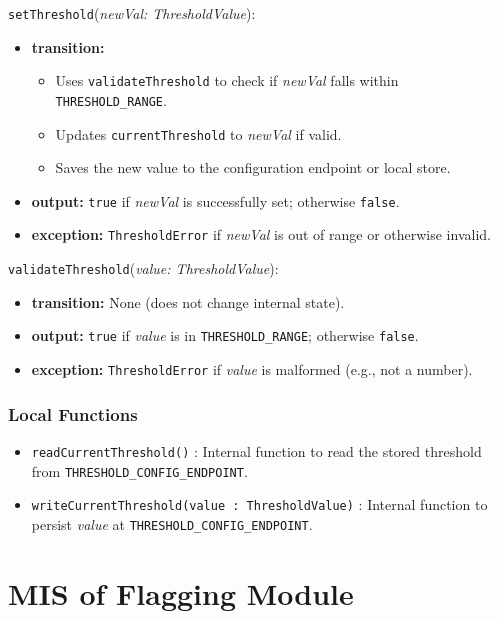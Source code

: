 \documentclass[12pt, titlepage]{article}
\begin{document}
\noindent \texttt{setThreshold}(\textit{newVal: ThresholdValue}):
\begin{itemize}
    \item \textbf{transition:}
    \begin{itemize}
        \item Uses \texttt{validateThreshold} to check if \textit{newVal} falls within \texttt{THRESHOLD\_RANGE}.
        \item Updates \texttt{currentThreshold} to \textit{newVal} if valid.
        \item Saves the new value to the configuration endpoint or local store.
    \end{itemize}
    \item \textbf{output:} \texttt{true} if \textit{newVal} is successfully set; otherwise \texttt{false}.
    \item \textbf{exception:} \texttt{ThresholdError} if \textit{newVal} is out of range or otherwise invalid.
\end{itemize}

\noindent \texttt{validateThreshold}(\textit{value: ThresholdValue}):
\begin{itemize}
    \item \textbf{transition:} None (does not change internal state).
    \item \textbf{output:} \texttt{true} if \textit{value} is in \texttt{THRESHOLD\_RANGE}; otherwise \texttt{false}.
    \item \textbf{exception:} \texttt{ThresholdError} if \textit{value} is malformed (e.g., not a number).
\end{itemize}

\subsubsection{Local Functions}

\begin{itemize}
    \item \texttt{readCurrentThreshold()} : Internal function to read the stored threshold from \texttt{THRESHOLD\_CONFIG\_ENDPOINT}.
    \item \texttt{writeCurrentThreshold(value : ThresholdValue)} : Internal function to persist \textit{value} at \texttt{THRESHOLD\_CONFIG\_ENDPOINT}.
\end{itemize}


\section{MIS of Flagging Module} \label{FlagModule}
\end{document}

